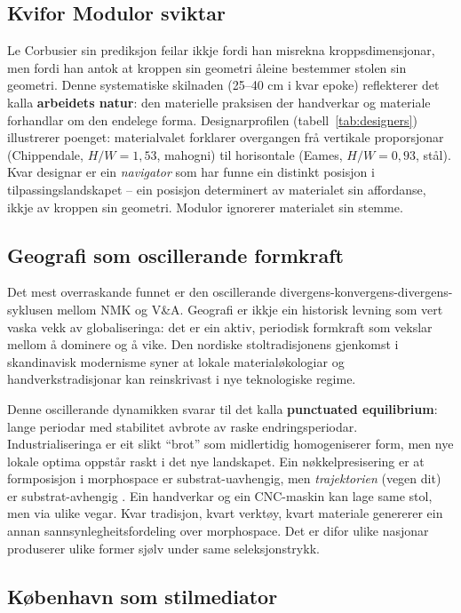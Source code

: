 \documentclass[10pt, a4paper, twocolumn]{article}
\begin{document}
\subsection{Kvifor Modulor sviktar}

Le Corbusier sin prediksjon feilar ikkje fordi han misrekna kroppsdimensjonar, men fordi han antok at kroppen sin geometri åleine bestemmer stolen sin geometri. Denne systematiske skilnaden (25--40 cm i kvar epoke) reflekterer det \citet{pye1968} kalla \textbf{arbeidets natur}: den materielle praksisen der handverkar og materiale forhandlar om den endelege forma. Designarprofilen (tabell~\ref{tab:designers}) illustrerer poenget: materialvalet forklarer overgangen frå vertikale proporsjonar (Chippendale, $H/W = 1{,}53$, mahogni) til horisontale (Eames, $H/W = 0{,}93$, stål). Kvar designar er ein \emph{navigator} som har funne ein distinkt posisjon i tilpassingslandskapet -- ein posisjon determinert av materialet sin affordanse, ikkje av kroppen sin geometri. Modulor ignorerer materialet sin stemme.

\subsection{Geografi som oscillerande formkraft}

Det mest overraskande funnet er den oscillerande divergens-konvergens-divergens-syklusen mellom NMK og V\&A. Geografi er ikkje ein historisk levning som vert vaska vekk av globaliseringa: det er ein aktiv, periodisk formkraft som vekslar mellom å dominere og å vike. Den nordiske stoltradisjonens gjenkomst i skandinavisk modernisme syner at lokale materialøkologiar og handverkstradisjonar kan reinskrivast i nye teknologiske regime.

Denne oscillerande dynamikken svarar til det \citet{eldredge1972} kalla \textbf{punctuated equilibrium}: lange periodar med stabilitet avbrote av raske endringsperiodar. Industrialiseringa er eit slikt ``brot'' som midlertidig homogeniserer form, men nye lokale optima oppstår raskt i det nye landskapet. Ein nøkkelpresisering er at formposisjon i morphospace er substrat-uavhengig, men \emph{trajektorien} (vegen dit) er substrat-avhengig \citep{sennett2008}. Ein handverkar og ein CNC-maskin kan lage same stol, men via ulike vegar. Kvar tradisjon, kvart verktøy, kvart materiale genererer ein annan sannsynlegheitsfordeling over morphospace. Det er difor ulike nasjonar produserer ulike former sjølv under same seleksjonstrykk.

\subsection{København som stilmediator}
\end{document}
